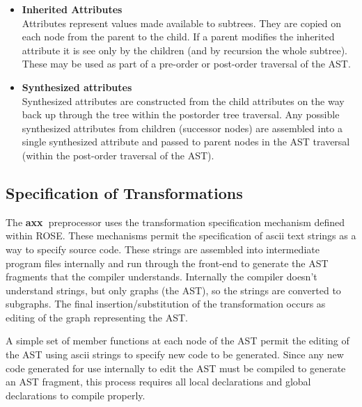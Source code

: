 \documentclass[10pt]{article}
\newcommand{\axx}{{\bf axx\ }}
\begin{document}
\begin{itemize}
     \item {\bf Inherited Attributes} \\ Attributes represent values made available to
           subtrees. They are copied on each node from the parent to the child. If a parent modifies
           the inherited attribute it is see only by the children (and by recursion the whole
           subtree). These may be used as part of a pre-order or post-order traversal of the AST.

     \item {\bf Synthesized attributes} \\ Synthesized attributes are constructed from the child
           attributes on the way back up through the tree within the postorder tree traversal. Any
           possible synthesized attributes from children (successor nodes) are assembled into a
           single synthesized attribute and passed to parent nodes in the AST traversal (within the
           post-order traversal of the AST).

\end{itemize}

\subsection{Specification of Transformations}

    The \axx preprocessor uses the transformation specification mechanism defined within ROSE. These
mechanisms permit the specification of ascii text strings as a way to specify source code.  These
strings are assembled into intermediate program files internally and run through the front-end to
generate the AST fragments that the compiler understands.  Internally the compiler doesn't
understand strings, but only graphs (the AST), so the strings are converted to subgraphs.  The final
insertion/substitution of the transformation occurs as editing of the graph representing the AST.

A simple set of member functions at each node of the AST permit the editing of the AST using ascii strings to
specify new code to be generated.  Since any new code generated for use internally to edit the AST must be compiled to
generate an AST fragment, this process requires all local declarations and global declarations to compile properly.
\end{document}
